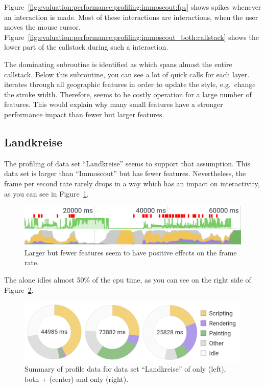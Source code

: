 Figure~\ref{fig:evaluation:performance:profiling:immoscout:fps} shows spikes whenever an interaction is made.
Most of these interactions are  interactions, when the user moves the mouse cursor.
Figure~\ref{fig:evaluation:performance:profiling:immoscout_both:callstack} shows the lower part of the callstack during such a  interaction.

The dominating subroutine is identified as  which spans almost the entire callstack.
Below this subroutine, you can see a lot of quick calls for each layer.
 iterates through all geographic features in order to update the style, e.g.\ change the stroke width.
Therefore,  seems to be costly operation for a large number of features.
This would explain why many small features have a stronger performance impact than fewer but larger features.


\subsection{Landkreise}
The profiling of data set ``Landkreise'' seems to support that assumption.
This data set is larger than ``Immoscout'' but has fewer features.
Nevertheless, the frame per second rate rarely drops in a way which has an impact on interactivity, as you can see in Figure~\ref{fig:evaluation:performance:profiling:landkreise_both:fps}.


\begin{figure}[ht]
  \centering
  \caption{
    Larger but fewer features seem to have positive effects on the frame rate.
  }\label{fig:evaluation:performance:profiling:landkreise_both:fps}
  \includegraphics[width=\textwidth]{figures/evaluation/performance/profiles/landkreise_both/fps}
\end{figure}

The \gv{} alone idles almost 50\% of the \gls{cpu} time, as you can see on the right side of Figure~\ref{fig:evaluation:performance:profiling:landkreise:summary}.
\begin{figure}[ht]
  \centering
  \includegraphics[width=\textwidth]{figures/evaluation/performance/summaries/landkreise}
  \caption{
    Summary of profile data for data set ``Landkreise'' of \tmap{} only (left), both \tmap{} + \gv{} (center) and only \gv{} (right).
  }\label{fig:evaluation:performance:profiling:landkreise:summary}
\end{figure}



